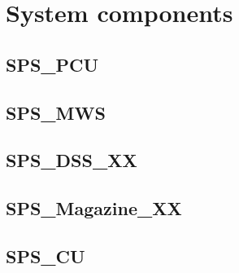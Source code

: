 \documentclass[Main]{subfiles}
\begin{document}
\section{System components}

\subsection{SPS\_PCU}

\subsection{SPS\_MWS}

\subsection{SPS\_DSS\_XX}

\subsection{SPS\_Magazine\_XX}

\subsection{SPS\_CU}
\end{document}
